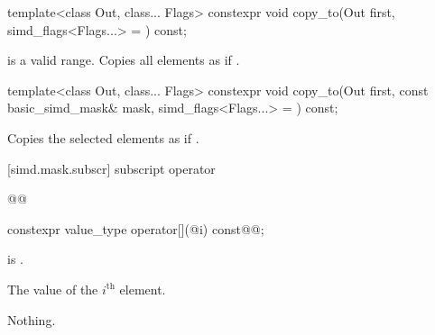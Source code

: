 \begin{itemdecl}
template<class Out, class... Flags>
  constexpr void copy_to(Out first, simd_flags<Flags...> = {}) const;
\end{itemdecl}

\begin{itemdescr}
  \MaskStoreDescr
    { is a valid range.}
    {Copies all  elements as if  \foralli.}
\end{itemdescr}

\begin{itemdecl}
template<class Out, class... Flags>
  constexpr void copy_to(Out first, const basic_simd_mask& mask, simd_flags<Flags...> = {}) const;
\end{itemdecl}

\begin{itemdescr}
  \MaskStoreDescr
  {\validMaskedRange}
  {Copies the selected elements as if  \forallmaskedi.}
\end{itemdescr}

[simd.mask.subscr]{ subscript operator\texorpdfstring{}{s}}

\begin{wgBRem}
\begin{itemdecl}
@@
\end{itemdecl}

\begin{itemdescr}
  \pnum{}

  \pnum{}

  \pnum{}
\end{itemdescr}
\end{wgBRem}

\begin{itemdecl}
constexpr value_type operator[](@\simdsizetype@ i) const@\wgRem{\&}@;
\end{itemdecl}

\begin{itemdescr}
  \pnum\expects
   is .

  \pnum\returns
  The value of the $i^\text{th}$ element.

  \pnum\throws Nothing.
\end{itemdescr}

